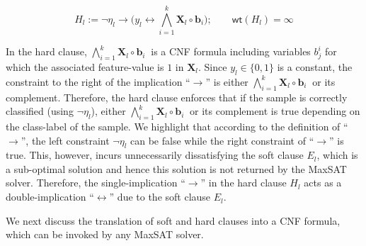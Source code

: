 \begin{itemize}
	\begin{equation}
			\label{interpretability_imli_hard_clause_rule_consistency}
		H_l:= \neg \eta_l \rightarrow \Big(y_l\leftrightarrow \bigwedge_{i=1}^k {\mathbf{X}_l} \circ {\mathbf{b}_{i}}\Big); \qquad  \mathsf{wt}(H_l)=\infty
	\end{equation}
	
	In the hard clause, $ \bigwedge_{i=1}^k {\mathbf{X}_l} \circ {\mathbf{b}_{i}}\ $ is a CNF formula including variables $ b_j^i $ for which the associated  feature-value is $ 1 $ in  $ \mathbf{X}_l $. Since $ y_l \in \{0,1\} $ is a constant, the constraint to the right of the implication ``$ \rightarrow $'' is either  $ \bigwedge_{i=1}^k {\mathbf{X}_l} \circ {\mathbf{b}_{i}}\ $ or its complement. Therefore, the hard clause enforces that if the sample is correctly classified (using $ \neg \eta_l $), either  $ \bigwedge_{i=1}^k {\mathbf{X}_l} \circ {\mathbf{b}_{i}}\ $ or its complement is true depending on the class-label of the sample.  We highlight that according to the definition of ``$ \rightarrow $'', the left constraint $ \neg \eta_l $ can  be false while the right constraint of 	``$ \rightarrow $'' is true.  This, however, incurs unnecessarily dissatisfying the soft clause $ E_l $, which is a sub-optimal solution and hence this solution is not returned by the MaxSAT solver. Therefore, the single-implication ``$ \rightarrow $'' in the hard clause $ H_l $ acts as a double-implication ``$ \leftrightarrow $''  due to the soft clause $ E_l $. 
	

	


\end{itemize}

	  We next discuss the translation of soft and hard clauses into a CNF formula, which can be invoked by any MaxSAT solver. 


